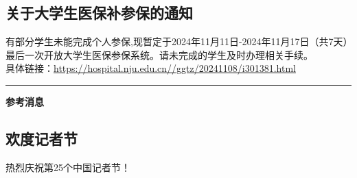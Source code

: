 \documentclass[letterpaper, 12pt]{article}
\begin{document}
\begin{multicols}{2}
\section{关于大学生医保补参保的通知}
有部分学生未能完成个人参保,现暂定于2024年11月11日-2024年11月17日（共7天）最后一次开放大学生医保参保系统。请未完成的学生及时办理相关手续。\\
具体链接：\url{https://hospital.nju.edu.cn//ggtz/20241108/i301381.html}\\

\end{multicols} 
\hrule
\vspace{4mm}
\centerline{\huge\textbf{参考消息}}
\begin{multicols}{2}
\section{欢度记者节}
热烈庆祝第25个中国记者节！
\end{multicols} 
\end{document}
